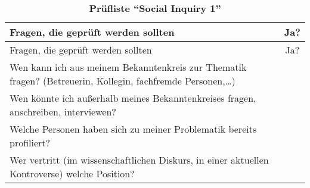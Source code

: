 \documentclass[]{article}
\begin{document}
\begin{longtable}[]{@{}lc@{}}
\caption{\textbf{Prüfliste ``Social Inquiry 1''}}\tabularnewline
\toprule
\begin{minipage}[b]{0.66\columnwidth}\raggedright\strut
Fragen, die geprüft werden sollten\strut
\end{minipage} & \begin{minipage}[b]{0.28\columnwidth}\centering\strut
Ja?\strut
\end{minipage}\tabularnewline
\midrule
\endfirsthead
\toprule
\begin{minipage}[b]{0.66\columnwidth}\raggedright\strut
Fragen, die geprüft werden sollten\strut
\end{minipage} & \begin{minipage}[b]{0.28\columnwidth}\centering\strut
Ja?\strut
\end{minipage}\tabularnewline
\midrule
\endhead
\begin{minipage}[t]{0.66\columnwidth}\raggedright\strut
Wen kann ich aus meinem Bekanntenkreis zur Thematik fragen? (Betreuerin,
Kollegin, fachfremde Personen,\ldots{})\strut
\end{minipage} & \begin{minipage}[t]{0.28\columnwidth}\centering\strut
\strut
\end{minipage}\tabularnewline
\begin{minipage}[t]{0.66\columnwidth}\raggedright\strut
Wen könnte ich außerhalb meines Bekanntenkreises fragen, anschreiben,
interviewen?\strut
\end{minipage} & \begin{minipage}[t]{0.28\columnwidth}\centering\strut
\strut
\end{minipage}\tabularnewline
\begin{minipage}[t]{0.66\columnwidth}\raggedright\strut
Welche Personen haben sich zu meiner Problematik bereits
profiliert?\strut
\end{minipage} & \begin{minipage}[t]{0.28\columnwidth}\centering\strut
\strut
\end{minipage}\tabularnewline
\begin{minipage}[t]{0.66\columnwidth}\raggedright\strut
Wer vertritt (im wissenschaftlichen Diskurs, in einer aktuellen
Kontroverse) welche Position?\strut
\end{minipage} & \begin{minipage}[t]{0.28\columnwidth}\centering\strut
\strut
\end{minipage}\tabularnewline

\end{longtable}
\end{document}
